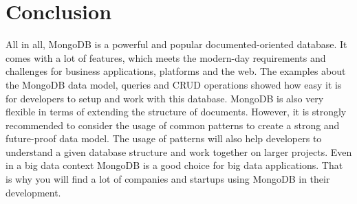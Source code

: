 \section{Conclusion}
All in all, MongoDB is a powerful and popular documented-oriented database. It comes with a lot of features, which meets the modern-day requirements and challenges for business applications, platforms and the web. 
The examples about the MongoDB data model, queries and CRUD operations showed how easy it is for developers to setup and work with this database. MongoDB is also very flexible in terms of extending the structure of documents. However, it is strongly recommended to consider the usage of common patterns to create a strong and future-proof data model. The usage of patterns will also help developers to understand a given database structure and work together on larger projects.
Even in a big data context MongoDB is a good choice for big data applications. That is why you will find a lot of companies and startups using MongoDB in their development.